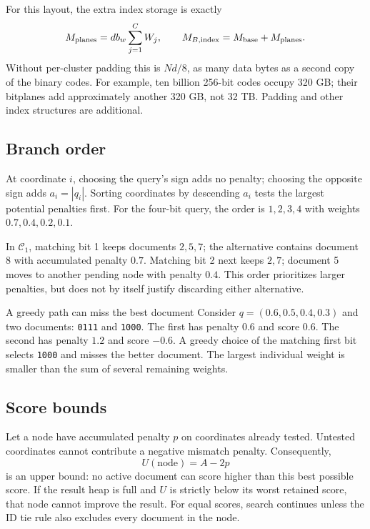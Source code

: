 For this layout, the extra index storage is exactly
\begin{equation}
M_{\rm planes}=d b_w\sum_{j=1}^{C}W_j,
\qquad M_{B,\rm index}=M_{\mathrm{base}}+M_{\rm planes}.
\label{eq:planes-storage}
\end{equation}
Without per-cluster padding this is $Nd/8$, as many data bytes as a second copy of the binary codes.
For example, ten billion 256-bit codes occupy 320 GB; their bitplanes add approximately
another 320 GB, not 32 TB. Padding and other index structures are additional.

\subsection{Branch order}
At coordinate $i$, choosing the query's sign adds no penalty; choosing the opposite sign adds
$a_i=|q_i|$. Sorting coordinates by descending $a_i$ tests the largest potential penalties first.
For the four-bit query, the order is $1,2,3,4$ with weights $0.7,0.4,0.2,0.1$.

In $\mathcal C_1$, matching bit 1 keeps documents $2,5,7$; the alternative contains document 8
with accumulated penalty $0.7$. Matching bit 2 next keeps $2,7$; document 5 moves to another
pending node with penalty $0.4$. This order prioritizes larger penalties, but does not by itself justify
discarding either alternative.

\begin{examplebox}{A greedy path can miss the best document}
Consider $q=(0.6,0.5,0.4,0.3)$ and two documents: \texttt{0111} and \texttt{1000}.
The first has penalty $0.6$ and score $0.6$. The second has penalty $1.2$ and score $-0.6$.
A greedy choice of the matching first bit selects \texttt{1000} and misses the better document.
The largest individual weight is smaller than the sum of several remaining weights.
\end{examplebox}

\subsection{Score bounds}
Let a node have accumulated penalty $p$ on coordinates already tested. Untested coordinates
cannot contribute a negative mismatch penalty. Consequently,
\begin{equation}
U(\text{node})=A-2p
\label{eq:branch-bound}
\end{equation}
is an upper bound: no active document can score higher than this best possible score. If the result heap is full and
$U$ is strictly below its worst retained score, that node cannot improve the result.
For equal scores, search continues unless the ID tie rule also excludes every document in the node.


